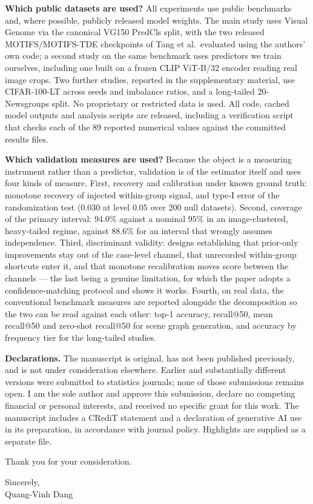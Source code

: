 \documentclass[11pt,a4paper]{article}
\begin{document}
\textbf{Which public datasets are used?}
All experiments use public benchmarks and, where possible, publicly released model weights.
The main study uses Visual Genome via the canonical VG150 PredCls split, with the two
released MOTIFS/MOTIFS-TDE checkpoints of Tang et al.\ evaluated using the authors' own code;
a second study on the same benchmark uses predictors we train ourselves, including one built
on a frozen CLIP ViT-B/32 encoder reading real image crops. Two further studies, reported in
the supplementary material, use CIFAR-100-LT across seeds and imbalance ratios, and a long-tailed
20-Newsgroups split. No proprietary or restricted data is used. All code, cached model
outputs and analysis scripts are released, including a verification script that checks each
of the 89 reported numerical values against the committed results files.

\textbf{Which validation measures are used?}
Because the object is a measuring instrument rather than a predictor, validation is of the
estimator itself and uses four kinds of measure. First, recovery and calibration under known
ground truth: monotone recovery of injected within-group signal, and type-I error of the
randomization test ($0.030$ at level $0.05$ over 200 null datasets). Second, coverage of the
primary interval: $94.0\%$ against a nominal $95\%$ in an image-clustered, heavy-tailed
regime, against $88.6\%$ for an interval that wrongly assumes independence. Third,
discriminant validity: designs establishing that prior-only improvements stay out of the
case-level channel, that unrecorded within-group shortcuts enter it, and that monotone
recalibration moves score between the channels --- the last being a genuine limitation, for
which the paper adopts a confidence-matching protocol and shows it works. Fourth, on real
data, the conventional benchmark measures are reported alongside the decomposition so the two
can be read against each other: top-1 accuracy, recall@50, mean recall@50 and zero-shot
recall@50 for scene graph generation, and accuracy by frequency tier for the long-tailed
studies.

\textbf{Declarations.} The manuscript is original, has not been published previously, and is
not under consideration elsewhere. Earlier and substantially different versions were submitted to statistics journals;
none of those submissions remains open. I am the sole
author and approve this submission, declare no competing financial or personal interests, and
received no specific grant for this work. The manuscript includes a CRediT statement and a
declaration of generative AI use in its preparation, in accordance with journal policy.
Highlights are supplied as a separate file.

Thank you for your consideration.

\vspace{1em}
\noindent
Sincerely,\\
Quang-Vinh Dang
\end{document}
